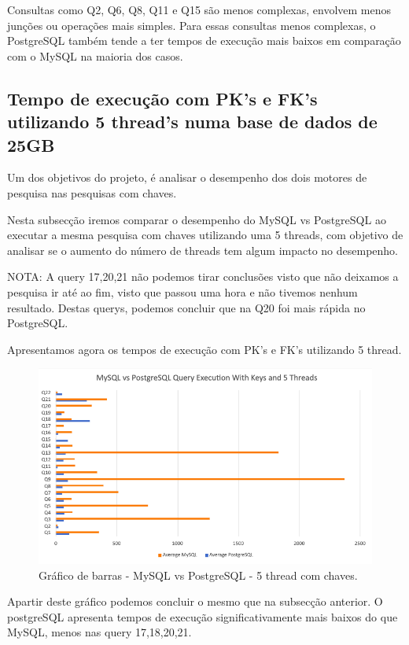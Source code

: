 \documentclass{article}
\begin{document}
Consultas como Q2, Q6, Q8, Q11 e Q15 são menos complexas, envolvem menos junções ou operações mais simples.
Para essas consultas menos complexas, o PostgreSQL também tende a ter tempos de execução mais baixos em comparação com o MySQL na maioria dos casos.


\clearpage
\subsection{Tempo de execução com PK's e FK's utilizando 5 thread's numa base
de dados de 25GB}

Um dos objetivos do projeto, é analisar o desempenho dos dois motores de pesquisa nas pesquisas com chaves.

Nesta subsecção iremos comparar o desempenho do MySQL vs PostgreSQL ao executar a mesma pesquisa com chaves utilizando uma 5 threads, com objetivo de analisar se o aumento do número de threads tem algum impacto no desempenho.


NOTA: A query 17,20,21 não podemos tirar conclusões visto que não deixamos a pesquisa ir até ao fim, visto que passou uma hora e não tivemos nenhum resultado. Destas querys, podemos concluir que na Q20 foi mais rápida no PostgreSQL.



Apresentamos agora os tempos de execução com PK's e FK's utilizando 5 thread.
\begin{figure}[H]
  \centering
  \includegraphics[width=\textwidth]{Graphs/mysqlvspostgres_withkeys_fivethreads.png}
  \caption{Gráfico de barras - MySQL vs PostgreSQL - 5 thread com chaves.}
  \label{fig:PKCreation2}
\end{figure}


\quad Apartir deste gráfico podemos concluir o mesmo que na subsecção anterior. O postgreSQL apresenta tempos de execução significativamente mais baixos do que MySQL, menos nas query 17,18,20,21.\\
\end{document}
